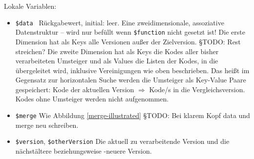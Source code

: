 Lokale Variablen:

\begin{itemize}
\item \texttt{\$data \hspace{3em}} Rückgabewert, initial: leer.
\newline Eine zweidimensionale, assoziative Datenstruktur -- wird nur befüllt wenn \texttt{\$function} nicht gesetzt ist! Die erste Dimension hat als Keys alle Versionen außer der Zielversion. {\color{blue} §TODO: Rest streichen?} Die zweite Dimension hat als Keys die Kodes aller bisher verarbeiteten Umsteiger und als Values die Listen der Kodes, in die übergeleitet wird, inklusive Vereinigungen wie oben beschrieben. Das heißt im Gegensatz zur horizontalen Suche werden die Umsteiger als Key-Value Paare gespeichert: Kode der aktuellen Version $\Rightarrow$ Kode/s in die Vergleichsversion. Kodes ohne Umsteiger werden nicht aufgenommen.
\item \texttt{\$merge}  \newline Wie Abbildung \ref{merge-illustrated} {\color{blue} §TODO: Bei klarem Kopf data und merge neu schreiben.}
\item \texttt{\$version}, \texttt{\$otherVersion} \newline Die aktuell zu verarbeitende Version und die nächstältere beziehungsweise -neuere Version. 
\end{itemize}


